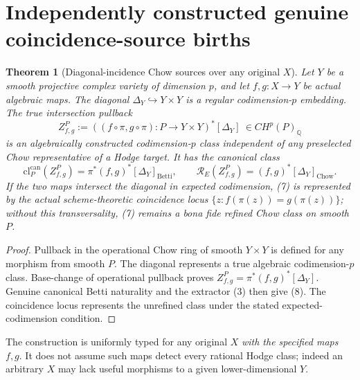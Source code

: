 \documentclass[11pt]{article}
\newtheorem{theorem}{Theorem}
\begin{document}
\section{Independently constructed genuine coincidence-source births}
\begin{theorem}[Diagonal-incidence Chow sources over any original \(X\)]
Let \(Y\) be a smooth projective complex variety of dimension
\(p\), and let \(f,g:X\to Y\) be \emph{actual algebraic maps}.
The diagonal \(\Delta_Y\hookrightarrow Y\times Y\) is a
regular codimension-\(p\) embedding. The true intersection
pullback
\[
 Z_{f,g}^{P}:=
 ((f\circ\pi,g\circ\pi):P\to Y\times Y)^*[\Delta_Y]
  \ \in CH^p(P)_{\mathbb Q} \tag{7}
\]
is an algebraically constructed codimension-\(p\) class
independent of any preselected Chow representative of
a Hodge target. It has the canonical class
\[
 \mathrm{cl}^{\mathrm{can}}_P(Z_{f,g}^{P})
 = \pi^*(f,g)^*[\Delta_Y]_{\mathrm{Betti}},\qquad
 \mathcal R_E(Z_{f,g}^{P})
 =(f,g)^*[\Delta_Y]_{\mathrm{Chow}}. \tag{8}
\]
If the two maps intersect the diagonal in expected codimension,
(7) is represented by the actual scheme-theoretic coincidence
locus \(\{z:f(\pi(z))=g(\pi(z))\}\);
without this transversality, (7) remains a bona fide refined
Chow class on smooth \(P\).
\end{theorem}
\begin{proof}
Pullback in the operational Chow ring of smooth
\(Y\times Y\) is defined for any morphism from smooth \(P\).
The diagonal represents a true algebraic codimension-\(p\)
class. Base-change of operational pullback proves
\(Z_{f,g}^{P}=\pi^*(f,g)^*[\Delta_Y]\).
Genuine canonical Betti naturality and the extractor (3)
then give (8). The coincidence locus represents the
unrefined class under the stated expected-codimension
condition.
\end{proof}
The construction is uniformly typed for any original \(X\)
\emph{with the specified maps \(f,g\)}.
It does not assume such maps detect every rational Hodge class;
indeed an arbitrary \(X\) may lack useful morphisms to a
given lower-dimensional \(Y\).
\end{document}
